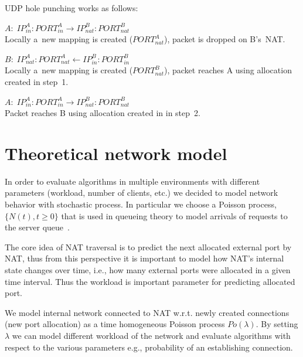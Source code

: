 \documentclass[twoside]{article}
\begin{document}
\begin{multicols}{2}
UDP hole punching works as follows:\\
\begin{compactitem}
 \item [1.] $A: \; IP^A_{in}:PORT^A_{in} \longrightarrow IP^B_{nat}:PORT^B_{nat}$ \\
Locally a~new mapping is created ($PORT^A_{nat}$), packet is dropped on B's~NAT.
 \item [2.] $B: \; IP^A_{nat}:PORT^A_{nat} \longleftarrow  IP^B_{in}:PORT^B_{in}$ \\
Locally a~new mapping is created ($PORT^B_{nat}$), packet reaches A using allocation created in step~1.
 \item [3.] $A: \; IP^A_{in}:PORT^A_{in} \longrightarrow IP^B_{nat}:PORT^B_{nat}$ \\
Packet reaches B using allocation created in in step~2.
\end{compactitem}


\section{Theoretical network model}
In order to evaluate algorithms in multiple environments with different parameters (workload, number of clients, etc.)
we decided to model network behavior with stochastic process. In particular we choose a Poisson process, $\{N(t), t\geq0\}$ 
that is used in queueing theory to model arrivals of requests to the server queue~\citep{Nelson:1995:PSP:207382}. 

The core idea of NAT traversal is to predict the next allocated external port by NAT, thus from this perspective 
it is important to model how NAT's internal state changes over time, i.e., how many external ports 
were allocated in a given time interval. Thus the workload is important parameter for predicting allocated port.

We model internal network connected to NAT w.r.t. newly created connections (new port allocation) as a 
time homogeneous Poisson process $Po(\lambda)$. By setting $\lambda$ we can model 
different workload of the network and evaluate algorithms with respect to the various parameters e.g., 
probability of an establishing connection. 



\end{multicols}
\end{document}
